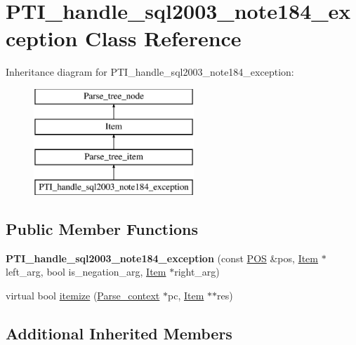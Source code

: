 \hypertarget{classPTI__handle__sql2003__note184__exception}{}\section{P\+T\+I\+\_\+handle\+\_\+sql2003\+\_\+note184\+\_\+exception Class Reference}
\label{classPTI__handle__sql2003__note184__exception}
Inheritance diagram for P\+T\+I\+\_\+handle\+\_\+sql2003\+\_\+note184\+\_\+exception\+:\begin{figure}[H]
\begin{center}
\leavevmode
\includegraphics[height=4.000000cm]{classPTI__handle__sql2003__note184__exception}
\end{center}
\end{figure}
\subsection*{Public Member Functions}
\begin{DoxyCompactItemize}
\item 
\mbox{\label{classPTI__handle__sql2003__note184__exception_a6153fdb4805505cb3d2da6b0da965ee2}} 
{\bfseries P\+T\+I\+\_\+handle\+\_\+sql2003\+\_\+note184\+\_\+exception} (const \mbox{\hyperlink{structYYLTYPE}{P\+OS}} \&pos, \mbox{\hyperlink{classItem}{Item}} $\ast$left\+\_\+arg, bool is\+\_\+negation\+\_\+arg, \mbox{\hyperlink{classItem}{Item}} $\ast$right\+\_\+arg)
\item 
virtual bool \mbox{\hyperlink{classPTI__handle__sql2003__note184__exception_afd59962bc1e58ba8f5bd626f222c6021}{itemize}} (\mbox{\hyperlink{structParse__context}{Parse\+\_\+context}} $\ast$pc, \mbox{\hyperlink{classItem}{Item}} $\ast$$\ast$res)
\end{DoxyCompactItemize}
\subsection*{Additional Inherited Members}


